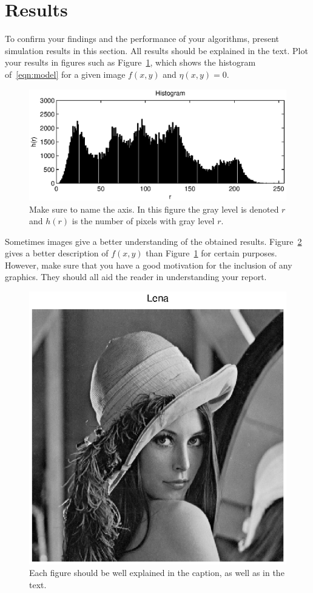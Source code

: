 \documentclass[a4paper]{article}
\begin{document}
\section{Results}
\label{sec:results}

To confirm your findings and the performance of your algorithms, present
simulation results in this section. All results should be explained in the text.
Plot your results in figures such as Figure~\ref{fig:histogram}, which shows the
histogram of~\eqref{eqn:model} for a given image $f(x,y)$ and
$\eta(x,y) = 0$.
\begin{figure}[!ht]
  \centering
  \includegraphics[width=0.9\columnwidth]{histogram.eps}
  \caption{Make sure to name the axis. In this figure the gray level is denoted
  $r$ and $h(r)$ is the number of pixels with gray level $r$.}
  \label{fig:histogram}
\end{figure}

Sometimes images give a better understanding of the obtained results.
Figure~\ref{fig:lena} gives a better description of $f(x,y)$ than
Figure~\ref{fig:histogram} for certain purposes. However, make sure that you
have a good motivation for the inclusion of any graphics. They should all aid
the reader in understanding your report.
\begin{figure}[!ht]
  \centering
  \includegraphics[width=0.9\columnwidth]{lena.eps}
  \caption{Each figure should be well explained in the caption, as well as in
  the text.}
  \label{fig:lena}
\end{figure}
\end{document}
